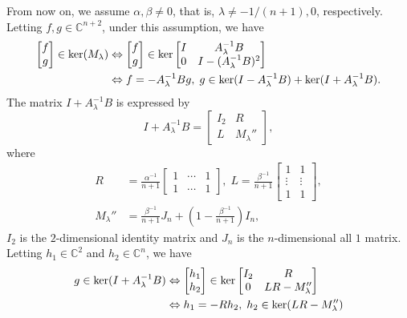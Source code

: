 \documentclass[a4paper,12pt]{article}
\numberwithin{equation}{section}
\begin{document}
From now on, we assume $\alpha,\beta\neq 0$, that is, $\lambda\neq -1/(n+1),0$, respectively.
Letting $f,g\in\mathbb{C}^{n+2}$, under this assumption, we have 
\begin{align}\label{f}
        \begin{bmatrix} f \\ g \end{bmatrix}\in \ker(M_\lambda) \notag 
        	& \Leftrightarrow \begin{bmatrix} f \\ g \end{bmatrix} \in \ker \begin{bmatrix} I & A_\lambda^{-1}B \\ 0 & I-(A_\lambda^{-1}B)^2 \end{bmatrix} \notag \\
                & \Leftrightarrow f=-A_\lambda^{-1}Bg,\;g\in \ker(I-A_\lambda^{-1}B)+\ker(I+A_\lambda^{-1}B).
\end{align}
The matrix $I+A_\lambda^{-1}B$ is expressed by
\begin{equation*}
 I+A_\lambda^{-1}B = \begin{bmatrix}  I_2 & R \\ L & M_\lambda'' \end{bmatrix},
\end{equation*}
where
\begin{align*} 
        R &=\frac{\alpha^{-1}}{n+1}\begin{bmatrix} 1 & \cdots & 1 \\ 1 & \cdots & 1 \end{bmatrix},\;
        L  = \frac{\beta^{-1}}{n+1}\begin{bmatrix} 1 & 1 \\  \vdots & \vdots \\ 1 & 1 \end{bmatrix}, \\
        M_\lambda''&=\frac{\beta^{-1}}{n+1}J_n +\left( 1-\frac{\beta^{-1}}{n+1} \right)I_n,
\end{align*}
$I_2$ is the $2$-dimensional identity matrix and $J_n$ is the $n$-dimensional all $1$ matrix. 
Letting $h_1\in \mathbb{C}^2$ and $h_2\in \mathbb{C}^n$, we have 
\begin{align}
\label{g}
g\in \ker(I+A_\lambda^{-1}B) \notag 
        	& \Leftrightarrow \begin{bmatrix} h_1 \\ h_2 \end{bmatrix} \in \ker \begin{bmatrix} I_2 & R \\ 0 & LR-M_\lambda'' \end{bmatrix} \notag \\
                & \Leftrightarrow h_1=-Rh_2,\;h_2\in \ker(LR-M_\lambda'')
        \end{align}
\end{document}

